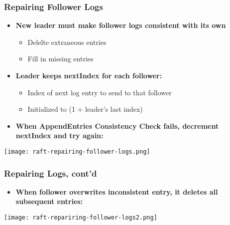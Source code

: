 \begin{frame}
    \frametitle{Repairing Follower Logs}
    \begin{itemize}
        \item \textbf{New leader must make follower logs consistent with its own}
            \begin{itemize}
                \item Delelte extraneous entries
                \item Fill in missing entries
            \end{itemize}
        \item \textbf{Leader keeps nextIndex for each follower:}
            \begin{itemize}
                \item Index of next log entry to send to that follower
                \item Initialized to (1 + leader's last index)
            \end{itemize}
        \item \textbf{When AppendEntries Consistency Check fails, decrement nextIndex and try again:}
    \end{itemize}
    \centering
    \texttt{[image: raft-repairing-follower-logs.png]}
\end{frame}

\begin{frame}
    \frametitle{Repairing Logs, cont'd}
    \begin{itemize}
        \item \textbf{When follower overwrites inconsistent entry, it deletes all subsequent entries:}
    \end{itemize}
    \centering
    \texttt{[image: raft-repariring-follower-logs2.png]}
\end{frame}

